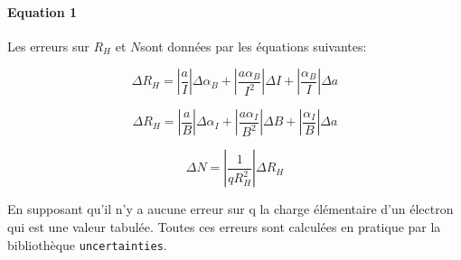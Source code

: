 \paragraph*{Equation 1}
Les erreurs sur \(R_H\) et \(N\)sont données par les équations suivantes:

\begin{equation}
    \label{eq:erreur:Rh_B}
    \Delta R_H = |\frac{a}{I}|\Delta \alpha_B + |\frac{a \alpha_B}{I^2}|\Delta I + |\frac{\alpha_B}{I}|\Delta a
\end{equation}

\begin{equation}
    \label{eq:erreur:Rh_I}
    \Delta R_H = |\frac{a}{B}|\Delta \alpha_I + |\frac{a \alpha_I}{B^2}|\Delta B + |\frac{\alpha_I}{B}|\Delta a
\end{equation}

\begin{equation}
    \label{eq:erreur:N}
    \Delta N = |\frac{1}{q R_H^2}|\Delta R_H
\end{equation}

En supposant qu'il n'y a aucune erreur sur q la charge élémentaire d'un électron qui est une valeur tabulée.
Toutes ces erreurs sont calculées en pratique par la bibliothèque \texttt{uncertainties}.
